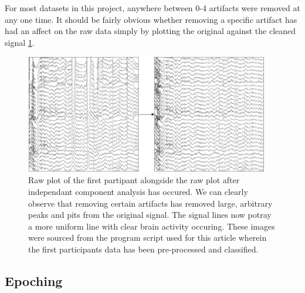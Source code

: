 \documentclass[11pt]{article}
\begin{document}
For most datasets in this project, anywhere between 0-4 artifacts were removed at any one time. It should be fairly obvious whether removing a specific artifact has had an affect on the raw data simply by plotting the original against the cleaned signal \ref{fig:ICA_Comp}. 

 \begin{figure}[tb]
\centering
\includegraphics[width=0.95\textwidth]{ICA_Comparison.png}
\caption{\label{fig:ICA_Comp}
Raw plot of the first partipant alongside the raw plot after independant component analysis has occured. We can clearly observe that removing certain artifacts has removed large, arbitrary peaks and pits from the original signal. The signal lines now potray a more uniform line with clear brain activity occuring. These images were sourced from the program script used for this article wherein the first participants data has been pre-processed and classified.}
\end{figure} 

\subsection{Epoching}
\end{document}
